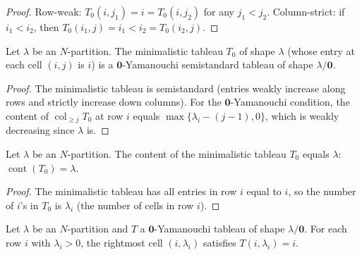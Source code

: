 \begin{proof}
\leanok
Row-weak: $T_0(i, j_1) = i = T_0(i, j_2)$ for any $j_1 < j_2$.
Column-strict: if $i_1 < i_2$, then $T_0(i_1, j) = i_1 < i_2 = T_0(i_2, j)$.
\end{proof}

\begin{lemma}
\label{lem.sf.minimalistic-yamanouchi}
\leanhelper
\leanok
Let $\lambda$ be an $N$-partition. The minimalistic tableau $T_0$ of shape
$\lambda$ (whose entry at each cell $(i,j)$ is $i$) is a $\mathbf{0}$-Yamanouchi semistandard tableau of shape
$\lambda/\mathbf{0}$.
\end{lemma}

\begin{proof}
\leanok
The minimalistic tableau is semistandard (entries weakly increase along rows
and strictly increase down columns). For the $\mathbf{0}$-Yamanouchi condition,
the content of $\operatorname{col}_{\geq j} T_0$ at row $i$ equals
$\max\{\lambda_i - (j-1), 0\}$, which is weakly decreasing since $\lambda$ is.
\end{proof}

\begin{lemma}
\label{lem.sf.minimalistic-content}
\leanhelper
\leanok
Let $\lambda$ be an $N$-partition. The content of the minimalistic tableau $T_0$
equals $\lambda$: $\operatorname{cont}(T_0) = \lambda$.
\end{lemma}

\begin{proof}
\leanok
The minimalistic tableau has all entries in row $i$ equal to $i$, so the number
of $i$'s in $T_0$ is $\lambda_i$ (the number of cells in row $i$).
\end{proof}

\begin{lemma}
\label{lem.sf.yamanouchi-rightmost}
\leanhelper
\leanok
Let $\lambda$ be an $N$-partition and $T$ a $\mathbf{0}$-Yamanouchi tableau
of shape $\lambda/\mathbf{0}$. For each row $i$ with $\lambda_i > 0$,
the rightmost cell $(i, \lambda_i)$ satisfies $T(i, \lambda_i) = i$.
\end{lemma}

